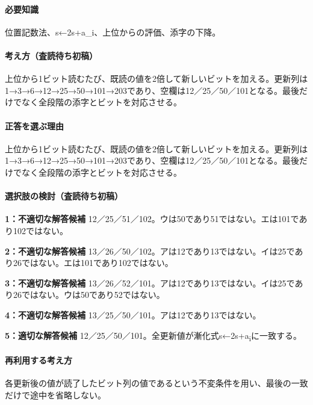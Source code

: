 \paragraph{必要知識} 位置記数法、s←2s+a\_i、上位からの評価、添字の下降。

\paragraph{考え方（査読待ち初稿）} 上位から1ビット読むたび、既読の値を2倍して新しいビットを加える。更新列は1→3→6→12→25→50→101→203であり、空欄は12／25／50／101となる。最後だけでなく全段階の添字とビットを対応させる。

\paragraph{正答を選ぶ理由} 上位から1ビット読むたび、既読の値を2倍して新しいビットを加える。更新列は1→3→6→12→25→50→101→203であり、空欄は12／25／50／101となる。最後だけでなく全段階の添字とビットを対応させる。

\paragraph{選択肢の検討（査読待ち初稿）}

\noindent\textbf{1：不適切な解答候補} 12／25／51／102。ウは50であり51ではない。エは101であり102ではない。\par

\noindent\textbf{2：不適切な解答候補} 13／26／50／102。アは12であり13ではない。イは25であり26ではない。エは101であり102ではない。\par

\noindent\textbf{3：不適切な解答候補} 13／26／52／101。アは12であり13ではない。イは25であり26ではない。ウは50であり52ではない。\par

\noindent\textbf{4：不適切な解答候補} 13／25／50／101。アは12であり13ではない。\par

\noindent\textbf{5：適切な解答候補} 12／25／50／101。全更新値が漸化式s←2s+a\textsubscript{i}に一致する。\par

\paragraph{再利用する考え方} 各更新後の値が読了したビット列の値であるという不変条件を用い、最後の一致だけで途中を省略しない。

